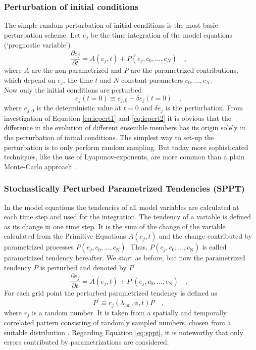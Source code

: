 \subsubsection{Perturbation of initial conditions }
The simple random perturbation of initial conditions is the most basic perturbation scheme.
Let $e_{j}$ be the time integration of the model equations (`prognostic variable')
\begin{equation}
    \frac{\partial e_{j}}{\partial t} = A(e_{j},t) + P(e_{j},c_{0},..., c_{N}) \quad ,
    \label{eq:icpert1}
\end{equation}
where $A$ are the non-parametrized and $P$ are the parametrized contributions, which depend on $e_{j}$, the time $t$ and $N$ constant parameters $c_{0},..., c_{N}$.\\
Now only the initial conditions are perturbed
\begin{equation}
    e_{j}(t=0) \equiv e_{j,0}+ \delta e_{j}(t=0) \quad ,
    \label{eq:icpert2}
\end{equation}
where $ e_{j,0}$ is the deterministic value at $t=0$ and $\delta e_{j}$ is the  perturbation.
From investigation of  Equation \eqref{eq:icpert1} and \eqref{eq:icpert2} it is obvious that the difference in the evolution of different ensemble members has its origin solely in the perturbation of initial conditions. The simplest way to set-up the perturbation is to only perform random sampling. But today more sophisticated techniques, like the use of Lyapunov-exponents, are more common than a plain Monte-Carlo approach \cite{0034-4885-63-2-201, buizza1999stochastic}.

\subsubsection{Stochastically Perturbed Parametrized Tendencies (SPPT)}
In the model equations the tendencies of all model variables are calculated at each time step and used for the integration. The tendency of a variable is defined as its change in one time step. It is the sum of the change of the variable calculated from the Primitive Equations $A(e_{j},t)$ and the change contributed by parametrized processes $P(e_{j},c_{0},..., c_{\mathrm{N}})$. Thus, $P(e_{j},c_{0},..., c_{\mathrm{N}})$ is called  parametrized tendency hereafter.
We start as before, but now the parametrized tendency $P$ is perturbed and denoted by $P^{\prime}$
\begin{equation}
    \frac{\partial e_{j}}{\partial t} = A(e_{j},t) + P^{\prime}(e_{j},c_{0},..., c_{\mathrm{N}}) \quad .
    \label{eq:sppt}
\end{equation}
For each grid point the perturbed parametrized tendency is defined as
\begin{equation}
   P^{\prime} \equiv r_{j}(\lambda_{\mathrm{lon}}, \phi, t) P \quad ,
\end{equation}
where $ r_{j}$ is a random number. It is taken from a spatially and temporally correlated pattern consisting of randomly sampled numbers, chosen from a suitable distribution \parencite{buizza1999stochastic}. Regarding Equation \eqref{eq:sppt}, it is noteworthy that only errors contributed by parametrizations are considered.


